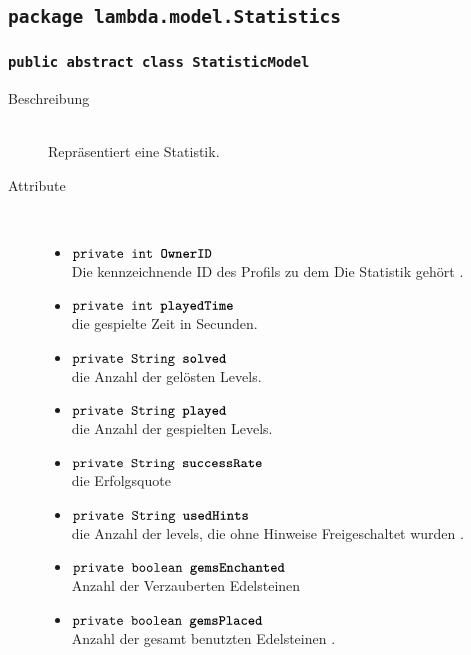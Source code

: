\subsection{\texttt{package lambda.model.Statistics}}
		\subsubsection{\normalfont \texttt{public abstract class \textbf{StatisticModel}}} 
		
		\begin{description}
		
		\item[Beschreibung] \hfill \\ Repräsentiert eine Statistik.
		\item[Attribute] \hfill \\
			\vspace{-.8cm}
			\begin{itemize}
				\item $\texttt{private int \textbf{OwnerID}}$ \\ Die kennzeichnende ID des Profils zu dem Die Statistik gehört .
				\item $\texttt{private int \textbf{playedTime}}$ \\ die gespielte Zeit in Secunden.
				\item $\texttt{private String \textbf{solved}}$ \\ die Anzahl der gelösten Levels.
				\item $\texttt{private String \textbf{played}}$ \\ die Anzahl der gespielten Levels.
				\item $\texttt{private String \textbf{successRate}}$ \\die Erfolgsquote
				\item $\texttt{private String \textbf{usedHints}}$ \\  die Anzahl der levels, die ohne Hinweise Freigeschaltet wurden .
				\item $\texttt{private boolean \textbf{gemsEnchanted}}$ \\ Anzahl der Verzauberten Edelsteinen 
				\item $\texttt{private boolean \textbf{gemsPlaced}}$ \\ Anzahl der gesamt benutzten Edelsteinen .
			\end{itemize}
			
		
			

\end{description}
